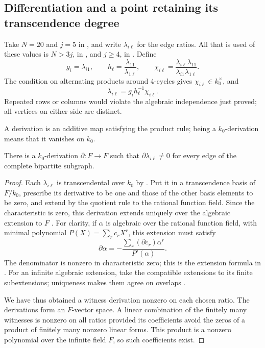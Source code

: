 \subsection{Differentiation and a point retaining its transcendence degree}

Take \(N=20\) and \(j=5\) in , and write
\(\lambda_{i\ell}\) for the edge ratios. All that is used of these values
is \(N>3j\), in , and \(j\ge4\), in
. Define
\[
 g_i=\lambda_{i1},\qquad
 h_\ell=\frac{\lambda_{11}}{\lambda_{1\ell}},\qquad
 \chi_{i\ell}=\frac{\lambda_{i\ell}\lambda_{11}}
                         {\lambda_{i1}\lambda_{1\ell}}.
\]
The condition on alternating products around 4-cycles gives \(\chi_{i\ell}\in k_0^\times\), and
\begin{equation}\label{alg:factorization}
 \lambda_{i\ell}=g_i h_\ell^{-1}\chi_{i\ell}.
\end{equation}
Repeated rows or columns would violate the algebraic independence just
proved; all vertices on either side are distinct.

A derivation is an additive map satisfying the product rule; being a
\(k_0\)-derivation means that it vanishes on \(k_0\).

\begin{lemma}\label{alg:derivation}
There is a \(k_0\)-derivation \(\partial:F\to F\) such that
\(\partial\lambda_{i\ell}\ne0\) for every edge of the complete bipartite subgraph.
\end{lemma}

\begin{proof}
Each
\(\lambda_{i\ell}\) is transcendental over \(k_0\) by
. Put it in a transcendence basis of
\(F/k_0\), prescribe its derivative to be one and those of the other
basis elements to be zero, and extend by the quotient rule to the
rational function field. Since the characteristic is zero, this
derivation extends uniquely over the algebraic extension to \(F\)
\cite[Theorems~1.5 and~4.1]{conradSeparability}.
For clarity, if \(\alpha\) is algebraic over the rational function
field, with minimal polynomial \(P(X)=\sum_r c_rX^r\), this extension
must satisfy
\[
 \partial\alpha
   =-\frac{\sum_r(\partial c_r)\alpha^r}{P'(\alpha)}.
\]
The denominator is nonzero in characteristic zero; this is the extension
formula in \cite[Theorem~B.8, equation~(B.1)]{conradSeparability}.
For an infinite algebraic extension, take the compatible extensions
to its finite subextensions; uniqueness makes them agree on overlaps
\cite[Section~5]{conradSeparability}.

We have thus obtained a witness derivation nonzero on each chosen
ratio. The derivations form an \(F\)-vector space. A linear combination
of the finitely many witnesses is nonzero on all ratios provided its
coefficients avoid the zeros of a product of finitely many nonzero
linear forms. This product is a nonzero polynomial over the infinite
field \(F\), so such coefficients exist.
\end{proof}

